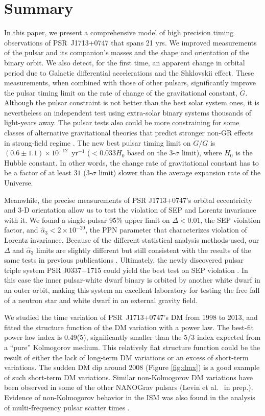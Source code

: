 \section{Summary}
In this paper, we present a comprehensive model of high precision timing observations of
PSR~J1713+0747 that spans 21 yrs. 
We improved measurements of the pulsar and its companion's masses and the
shape and orientation of the binary orbit. We also detect, for the first time, an apparent
change in orbital period due to Galactic differential accelerations and the Shklovskii effect.
These measurements, when combined with those of other pulsars, 
significantly improve the pulsar timing limit on the rate of change of the gravitational
constant, $\dot{G}$. Although the pulsar constraint is not better than the
best solar system ones, it is nevertheless an independent test using 
extra-solar binary systems thousands of light-years away. The pulsar tests
also could be more constraining for some
classes of alternative gravitational theories that predict stronger non-GR effects in
strong-field regime \citep{wex14}.
The new best pulsar timing limit on $\dot{G}/G$ is 
$(0.6\pm1.1)\times10^{-12}$~yr$^{-1}$ ($<0.033H_0$ based on the 3-$\sigma$ limit), where $H_0$ is the Hubble constant. 
In other words, the change rate of gravitational constant has to be a factor
of at least $31$ (3-$\sigma$ limit) slower than the average expansion rate of
the Universe.

Meanwhile, the precise measurements of PSR J1713+0747's orbital eccentricity and
3-D orientation allow us to test the violation of SEP and 
Lorentz invariance with it. We found a single-pulsar 95\% upper limit on 
$\Delta <0.01$, the SEP violation factor, and
$\hat{\alpha}_3<2\times10^{-20}$, the PPN parameter that characterizes
violation of Lorentz invariance. 
Because of the different statistical analysis methods used, our 
$\Delta$ and $\hat{\alpha}_3$ limits  are slightly
different but still consistent with the results of the same tests in previous publications 
\citep{wex00, sns+05, sfl+05, gsf+11, fkw12}.
Ultimately, the newly discovered pulsar triple system PSR J0337+1715 \citep{rsa+14} 
could yield the best test on SEP violation \citep{fkw12, ssa+15, bbc+15}. In this case 
the inner pulsar-white dwarf binary is orbited by another white dwarf in an
outer orbit, making this system an excellent laboratory for testing
the free fall of a neutron star and white dwarf in an external gravity field.

We studied the time variation of PSR~J1713+0747's DM from 1998 to 2013, and
fitted the structure function of the DM variation with a power law.  
The best-fit power law index is 0.49(5), significantly smaller than the 5/3 
index expected from a ``pure'' Kolmogorov medium. This relatively flat structure
function could be the result of either the lack of long-term DM variations or an
excess of short-term variations. The sudden DM dip around 2008 (Figure
\ref{fig:dmx}) is a good example of such short-term DM variations.
Similar non-Kolmogorov DM variations have been observed in some of the
other NANOGrav pulsars (Levin et al. \ in prep.). Evidence of non-Kolmogorov behavior 
in the ISM was also found in the analysis of multi-frequency pulsar scatter times \citep{lkk15}.


